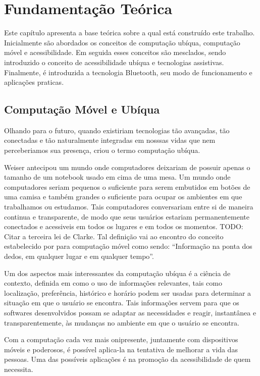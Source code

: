 \documentclass[twoside,english,brazilian]{UNISINOSartigo}
\begin{document}
\section{Fundamentação Teórica}
Este capítulo apresenta a base teórica sobre a qual está construído este trabalho. Inicialmente são abordados os conceitos de computação ubíqua, computação móvel e acessibilidade. Em seguida esses conceitos são mesclados, sendo introduzido o conceito de acessibilidade ubíqua e tecnologias assistivas. Finalmente, é introduzida a tecnologia Bluetooth, seu modo de funcionamento e aplicações praticas.

\subsection{Computação Móvel e Ubíqua}
Olhando para o futuro, quando existiriam tecnologias tão avançadas, tão conectadas e tão naturalmente integradas em nosssas vidas que nem perceberiamos sua presença,  criou o termo computação ubíqua. 

Weiser antecipou um mundo onde computadores deixariam de possuir apenas o tamanho de um notebook usado em cima de uma mesa. Um mundo onde computadores seriam pequenos o suficiente para serem embutidos em botões de uma camisa e também grandes o suficiente para ocupar os ambientes em que trabalhamos ou estudamos. Tais computadores conversariam entre si de maneira continua e transparente, de modo que seus usuários estariam permanentemente conectados e acessiveis em todos os lugares e em todos os momentos. TODO: Citar a terceira lei de Clarke. Tal definição vai ao encontro do conceito estabelecido por  para computação móvel como sendo: “Informação na ponta dos dedos, em qualquer lugar e em qualquer tempo”.

Um dos aspectos mais interessantes da computação ubíqua é a ciência de contexto, definida em  como o uso de informações relevantes, tais como localização, preferência, histórico e horário podem ser usadas para determinar a situação em que o usuário se encontra. Tais informações servem para que os softwares desenvolvidos possam se adaptar as necessidades e reagir, instantânea e transparentemente, às mudanças no ambiente em que o usuário se encontra.

Com a computação cada vez mais onipresente, juntamente com dispositivos móveis e poderosos, é possível aplica-la na tentativa de melhorar a vida das pessoas. Uma das possíveis aplicações é na promoção da acessibilidade de quem necessita. 
\end{document}
